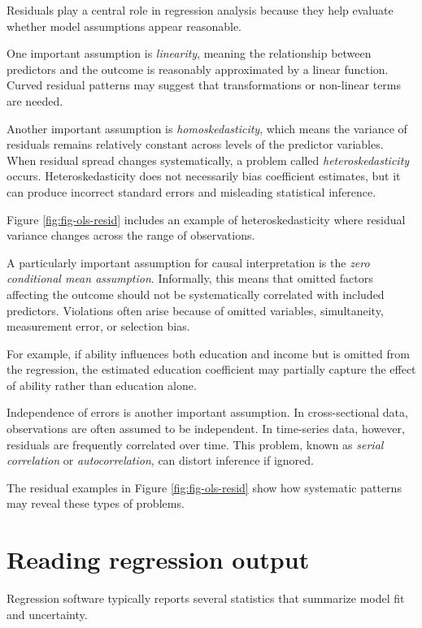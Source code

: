 \documentclass[
  11pt,
  oneside]{book}
\begin{document}
Residuals play a central role in regression analysis because they help evaluate whether model assumptions appear reasonable.

One important assumption is \emph{linearity}, meaning the relationship between predictors and the outcome is reasonably approximated by a linear function. Curved residual patterns may suggest that transformations or non-linear terms are needed.

Another important assumption is \emph{homoskedasticity}, which means the variance of residuals remains relatively constant across levels of the predictor variables. When residual spread changes systematically, a problem called \emph{heteroskedasticity} occurs. Heteroskedasticity does not necessarily bias coefficient estimates, but it can produce incorrect standard errors and misleading statistical inference.

Figure \ref{fig:fig-ols-resid} includes an example of heteroskedasticity where residual variance changes across the range of observations.

A particularly important assumption for causal interpretation is the \emph{zero conditional mean assumption}. Informally, this means that omitted factors affecting the outcome should not be systematically correlated with included predictors. Violations often arise because of omitted variables, simultaneity, measurement error, or selection bias.

For example, if ability influences both education and income but is omitted from the regression, the estimated education coefficient may partially capture the effect of ability rather than education alone.

Independence of errors is another important assumption. In cross-sectional data, observations are often assumed to be independent. In time-series data, however, residuals are frequently correlated over time. This problem, known as \emph{serial correlation} or \emph{autocorrelation}, can distort inference if ignored.

The residual examples in Figure \ref{fig:fig-ols-resid} show how systematic patterns may reveal these types of problems.

\section{Reading regression output}\label{reading-regression-output}

Regression software typically reports several statistics that summarize model fit and uncertainty.
\end{document}
